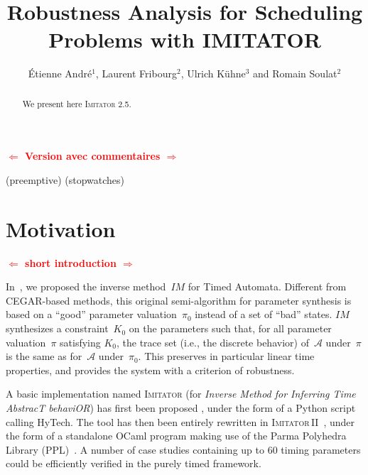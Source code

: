 \documentclass{llncs}
\title{Robustness Analysis for Scheduling Problems with IMITATOR}
\author{\'Etienne Andr\'e$^1$, Laurent Fribourg$^2$, Ulrich K\"uhne$^3$ and Romain Soulat$^2$}
\institute{$^1$LIPN, CNRS UMR 7030, Université Paris 13, France \\
$^2$LSV -- ENS Cachan \& CNRS \\
$^3$Universit\"at Bremen, Germany}
\newcommand{\A}{\mathcal{A}}
\newcommand{\Ko}{K_0}
\newcommand{\pio}{\pi_0}
\newcommand{\piprime}{\pi}
\newcommand{\IM}{\mathit{IM}}
\newcommand{\hytech}{{\sc HyTech}}
\newcommand{\imitator}{\textsc{Imitator}}
\newcommand{\imitatordeux}{\textsc{Imitator}\,II}
\newcommand{\ocaml}{OCaml}
\newcommand{\python}{Python}
\newcommand{\commentaire}[1]{\textcolor{red}{\textbf{$\Leftarrow$  #1 $\Rightarrow$}}}
\begin{document}
\maketitle

\begin{abstract}
	We present here \imitator{} 2.5.
\end{abstract}


\commentaire{Version avec commentaires}

(preemptive)
(stopwatches)
 
\section{Motivation}

\commentaire{short introduction}

In~\cite{acef09}, we proposed the inverse method~$\IM$ for Timed Automata.
Different from CEGAR-based methods, this original semi-algorithm for parameter synthesis is based on a ``good'' parameter valuation~$\pio$ instead of a set of ``bad'' states.
$\IM$ synthesizes a constraint~$\Ko$ on the parameters such that, for all parameter valuation~$\piprime$ satisfying $\Ko$, the trace set (i.e., the discrete behavior) of~$\A$ under~$\piprime$ is the same as for~$\A$ under~$\pio$.
This preserves in particular linear time properties, and provides the system with a criterion of robustness.

A basic implementation named \imitator{} (for \emph{Inverse Method for Inferring Time AbstracT behaviOR}) has first been proposed%
, under the form of a \python{} script calling \hytech{}.
The tool has then been entirely rewritten in \imitatordeux{}~\cite{and10}, under the form of a standalone \ocaml{} program making use of the Parma Polyhedra Library (PPL)~\cite{bhz08}.
A number of case studies containing up to 60 timing parameters could be efficiently verified in the purely timed framework.
\end{document}
